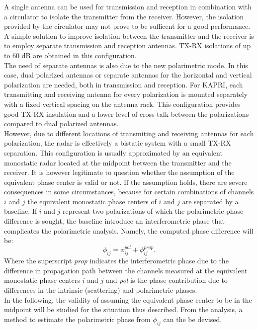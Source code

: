 A single antenna can be  used for transmission and reception in combination with a circulator to isolate the transmitter from the receiver. However, the isolation provided by the circulator may not prove to be sufficent for a good performance. A simple solution  to improve isolation between the transmitter and the receiver is to employ separate transmission and reception antennas\cite{Stove1992, Strozzi2011}. TX-RX isolations of up to 60 dB are obtained in this configuration.\\The need of separate antennas is also due to  the new polarimetric mode. In this case, dual polarized antennas or separate antennas for the horizontal and vertical polarization are needed, both in transmission and reception. For KAPRI, each transmitting and receiving antenna for every polarization is mounted separately with a fixed vertical spacing on the antenna rack. This configuration provides good TX-RX insulation and a lower level of cross-talk between the polarizations compared to dual polarized antennas.\\ However, due to different locations of transmiting and receiving antennas for each polarization, the radar is effectively a bistatic system with a small TX-RX separation. This configuration is usually approximated by an equivalent monostatic radar located at the midpoint between the transmitter and the receiver. It is however legitimate to question whether the assumption of the equivalent phase center is valid or not. If the assumption holds, there are severe consequences in some circumstances, because for certain combinations of channels $i$ and $j$ the equivalent monostatic phase centers of $i$ and $j$ are separated by a baseline. If $i$ and $j$ represent two polarizations of which the polarimetric phase difference is sought, the baseline introduce an interferometric phase that complicates the polarimetric analysis. Namely, the computed phase difference will be:
\begin{equation}
	\phi_{ij} = \phi_{ij}^{pol} + \phi_{ij}^{prop}.
\end{equation}
Where the superscript \emph{prop} indicates the interferometric phase due to the difference in propagation path\cite{Satake2001} between the channels measured at the equivalent monostatic phase centers $i$ and $j$ and \emph{pol} is the phase contribution due to differences in the intrinsic (scattering) and polarimetric phases.\\
In the following, the validity of assuming the equivalent phase center to be in the midpoint will be studied for the situation thus described.  From the analysis, a method to estimate the polarimetric phase from $\phi_{ij}$ can the be devised.\\
